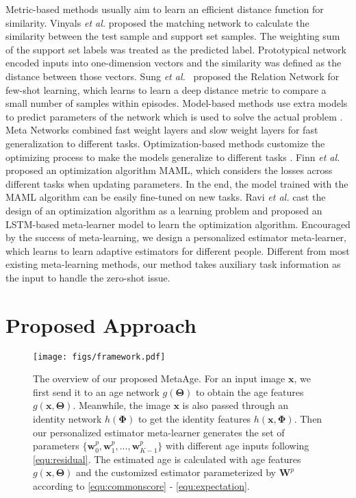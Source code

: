 \documentclass[journal,twoside]{IEEEtran}
\begin{document}
Metric-based methods usually aim to learn an efficient distance function for similarity.
Vinyals \emph{et al.} \cite{vinyals2016matching} proposed the matching network to calculate the similarity between the test sample and support set samples. The weighting sum of the support set labels was treated as the predicted label.
Prototypical network \cite{snell2017prototypical} encoded inputs into one-dimension vectors and the similarity was defined as the distance between those vectors. Sung \emph{et al.}~\cite{sung2018learning} proposed the Relation Network for few-shot learning, which learns to learn a deep distance metric to compare a small number of samples within episodes.
Model-based methods use extra models to predict parameters of the network which is used to solve the actual problem \cite{jia2016dynamic}. Meta Networks \cite{munkhdalai2017meta} combined fast weight layers and slow weight layers for fast generalization to different tasks. Optimization-based methods customize the optimizing process to make the models generalize to different tasks \cite{andrychowicz2016learning}. Finn \emph{et al.} \cite{finn2017model} proposed an optimization algorithm MAML, which considers the losses across different tasks when updating parameters. In the end, the model trained with the MAML algorithm can be easily fine-tuned on new tasks. Ravi \emph{et al.} \cite{ravi2016optimization} cast the design of an optimization algorithm as a learning problem and proposed an LSTM-based meta-learner model to learn the optimization algorithm.
Encouraged by the success of meta-learning, we design a personalized estimator meta-learner, which learns to learn adaptive estimators for different people. Different from most existing meta-learning methods, our method takes auxiliary task information as the input to handle the zero-shot issue.

\section{Proposed Approach}

\begin{figure*}[t]
\begin{center}
   \texttt{[image: figs/framework.pdf]}
\end{center}
   \caption{The overview of our proposed MetaAge. For an input image $\bm{x}$, we first send it to an age network $g(\bm{\Theta})$ to obtain the age features $g(\bm{x},\bm{\Theta})$. Meanwhile, the image $\bm{x}$ is also passed through an identity network $h(\bm{\Phi})$ to get the identity features $h(\bm{x},\bm{\Phi})$. Then our personalized estimator meta-learner generates the set of parameters $\{ \bm{w}_0^{p}, \bm{w}_1^{p}, ..., \bm{w}_{K-1}^{p} \}$ with different age inputs following \eqref{equ:residual}. The estimated age is calculated with age features $g(\bm{x},\bm{\Theta})$ and the customized estimator parameterized by $\bm{W}^{p}$ according to \eqref{equ:commonscore} - \eqref{equ:expectation}.}
\label{fig:flowchart}
\end{figure*}
\end{document}
